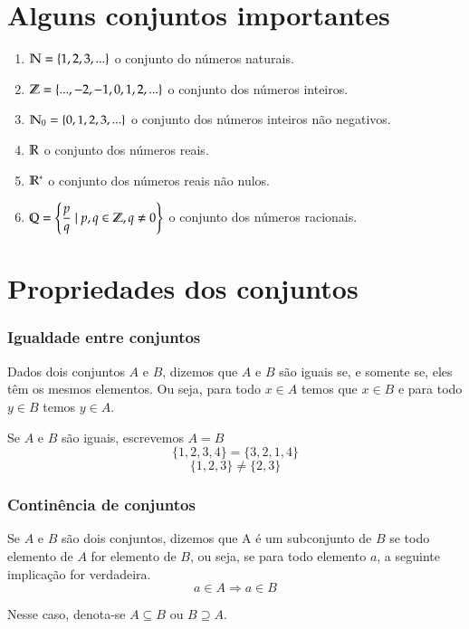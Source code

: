 \section{Alguns conjuntos importantes}
\begin{enumerate}
\item $\mathbb{N} = \{1,2,3,...\}$ o conjunto do n{\'u}meros naturais.
\item $\mathbb{Z} = \{...,-2,-1,0,1,2,...\}$ o conjunto dos n{\'u}meros inteiros.
\item $\mathbb{N}_0 = \{0,1,2,3,...\}$ o conjunto dos n{\'u}meros inteiros n{\~a}o negativos.
\item $\mathbb{R} $ o conjunto dos n{\'u}meros reais.
\item $\mathbb{R}^*$ o conjunto dos n{\'u}meros reais n{\~a}o nulos.
\item $\mathbb{Q} = \left\{\dfrac{p}{q} \mid p,q \in \mathbb{Z}, q \neq 0 \right\}$ o conjunto dos n{\'u}meros racionais.
\end{enumerate}

\section{Propriedades dos conjuntos}

\subsubsection{Igualdade entre conjuntos}

\begin{definicao}
	Dados dois conjuntos $A$ e $B$, dizemos que $A$ e $B$ s{\~a}o iguais se, e somente se, eles t{\^e}m os mesmos elementos. Ou seja, para todo $x \in A$ temos que $x \in B$ e para todo $y \in B$ temos $y \in A$.
\end{definicao}

Se $A$ e $B$ s{\~a}o iguais, escrevemos $A = B$
\[ \{1,2,3,4\} = \{3,2,1,4\} \]
\[ \{1,2,3\} \neq \{2,3\} \]

\subsubsection{Contin{\^e}ncia de conjuntos}

Se $A$ e $B$ s{\~a}o dois conjuntos, dizemos que A {\'e} um subconjunto de $B$ se todo elemento de $A$ for elemento de $B$, ou seja, se para todo elemento $a$, a seguinte implica{\c c}{\~a}o for verdadeira.
\[ a \in A \Rightarrow a \in B\]

Nesse caso, denota-se $A \subseteq B$ ou $B \supseteq A$.

